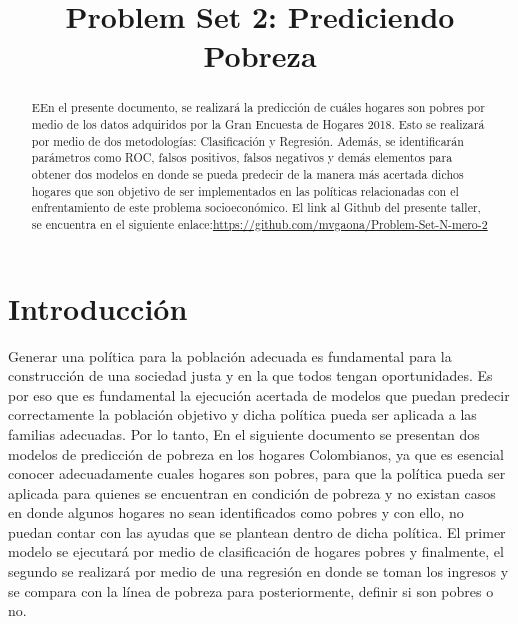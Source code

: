 \documentclass[conference, 10pt]{IEEEtran}
\begin{document}
\title{Problem Set 2: Prediciendo Pobreza\\}

\author{
\and
{}
}

\maketitle

\begin{abstract}
EEn el presente documento, se realizará la predicción de cuáles hogares son pobres por medio de los datos adquiridos por la Gran Encuesta de Hogares 2018. Esto se realizará por medio de dos metodologías: Clasificación y Regresión. Además, se identificarán parámetros como ROC, falsos positivos, falsos negativos  y demás elementos para obtener dos modelos en donde se pueda predecir de la manera más acertada dichos hogares que son objetivo de ser implementados en las políticas relacionadas con el enfrentamiento de este problema socioeconómico. El link al Github del presente taller, se encuentra en el siguiente enlace:\url{https://github.com/mvgaona/Problem-Set-N-mero-2}\\

\end{abstract}


\section{Introducción}
Generar una política para la población adecuada es fundamental para la construcción de una sociedad justa y en la que todos tengan oportunidades. Es por eso que es fundamental la ejecución acertada de modelos que puedan predecir correctamente la población objetivo y dicha política pueda ser aplicada a las familias adecuadas. Por lo tanto, En el siguiente documento se presentan dos modelos de predicción de pobreza en los hogares Colombianos, ya que es esencial conocer adecuadamente cuales hogares son pobres, para que la política pueda ser aplicada para quienes se encuentran en condición de pobreza y no existan casos en donde algunos hogares no sean identificados como pobres y con ello, no puedan contar con las ayudas que se plantean dentro de dicha política. El primer modelo se ejecutará por medio de clasificación de hogares pobres y finalmente, el segundo se realizará por  medio de una regresión en donde se toman los ingresos y se compara con la línea de pobreza para posteriormente, definir si son pobres o no. 
\end{document}
